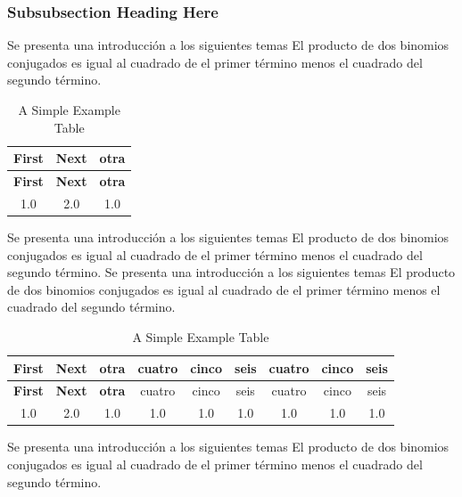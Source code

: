 \documentclass[journal]{IEEEtran}
\begin{document}
\subsubsection{Subsubsection Heading Here}
Se presenta una introducción a los siguientes temas El producto de dos binomios conjugados es igual al cuadrado de el primer término menos el cuadrado del segundo término.
\begin{table}[!t]
\renewcommand{\arraystretch}{1.3}
\caption{A Simple Example Table}
\label{table_example}
\centering
\begin{tabular}{c||c||c}
\hline
\bfseries First & \bfseries Next &  \bfseries otra \\
\hline\hline
\bfseries First & \bfseries Next &  \bfseries otra \\
\hline\hline
1.0 & 2.0 & 1.0\\
\hline
\end{tabular}
\end{table}
Se presenta una introducción a los siguientes temas El producto de dos binomios conjugados es igual al cuadrado de el primer término menos el cuadrado del segundo término.
Se presenta una introducción a los siguientes temas El producto de dos binomios conjugados es igual al cuadrado de el primer término menos el cuadrado del segundo término.
\begin{table}[!t]
\renewcommand{\arraystretch}{1.3}
\caption{A Simple Example Table}
\label{table_example}
\centering
\begin{tabular}{c||c||c||c||c|c|c|c|c|}
\hline
\bfseries First & \bfseries Next &  \bfseries otra & cuatro & cinco & seis & cuatro & cinco & seis \\ 
\hline\hline
\bfseries First & \bfseries Next &  \bfseries otra& cuatro & cinco & seis & cuatro & cinco & seis \\
\hline\hline
1.0 & 2.0 & 1.0&1.0&1.0&1.0&1.0&1.0&1.0 \\
\hline
\end{tabular}
\end{table}
Se presenta una introducción a los siguientes temas El producto de dos binomios conjugados es igual al cuadrado de el primer término menos el cuadrado del segundo término.
\end{document}
